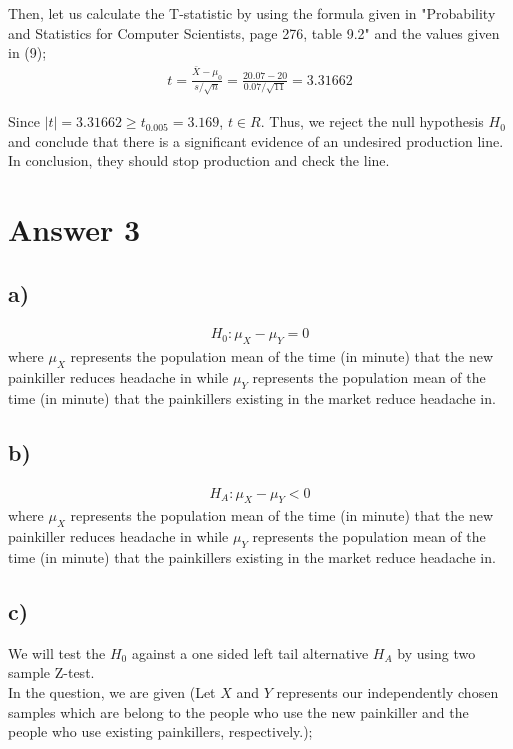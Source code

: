 \documentclass[12pt]{article}
\begin{document}
Then, let us calculate the T-statistic by using the formula given in "Probability and Statistics for Computer Scientists, page 276, table 9.2" and the values given in (9);
\begin{equation} 
\begin{split}
t = \frac{\bar{X}-\mu_{0}}{s/\sqrt{n}} = \frac{20.07-20}{0.07/\sqrt{11}} = 3.31662
\end{split}
\end{equation}

Since $|t| = 3.31662  \geq t_{0.005} = 3.169$, $ t \in R$. Thus, we reject the null hypothesis $H_{0}$ and conclude that there is a significant evidence of an undesired production line. In conclusion, they should stop production and check the line.

\section*{Answer 3}
\subsection*{a)}
\begin{equation*} 
\begin{split}
H_{0}: \mu_{X} - \mu_{Y} = 0
\end{split}
\end{equation*}
where $\mu_{X}$ represents the population mean of the time (in minute) that the new painkiller reduces headache in while $\mu_{Y}$ represents the population mean of the time (in minute) that the painkillers existing in the market reduce headache in.
\subsection*{b)}
\begin{equation*} 
\begin{split}
H_{A}: \mu_{X} - \mu_{Y} < 0
\end{split}
\end{equation*}
where $\mu_{X}$ represents the population mean of the time (in minute) that the new painkiller reduces headache in while $\mu_{Y}$ represents the population mean of the time (in minute) that the painkillers existing in the market reduce headache in.

\subsection*{c)} We will test the $H_{0}$ against a one sided left tail alternative $H_{A}$ by using two sample Z-test.\\ 
In the question, we are given (Let $X$ and $Y$ represents our independently chosen samples which are belong to the people who use the new painkiller and the people who use existing painkillers, respectively.); 
\end{document}
